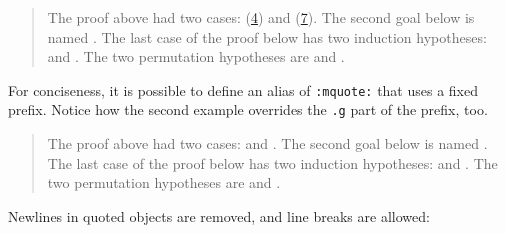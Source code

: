 \documentclass[a4paper]{article}
\begin{document}
\begin{quote}
The proof above had two cases:  (\hyperref[references-rst-s-destruct-n-g-1-h-n-0-0]{4}) and  (\hyperref[references-rst-s-destruct-n-g-s-n0-h-n-s-0]{7}).
The second goal below is named .
The last case of the proof below has two induction hypotheses:  and . The two permutation hypotheses are  and .
\end{quote}

For conciseness, it is possible to define an alias of \texttt{:mquote:} that uses a fixed prefix.  Notice how the second example overrides the \texttt{.g} part of the prefix, too.

\begin{quote}
The proof above had two cases:  and .
The second goal below is named .
The last case of the proof below has two induction hypotheses:  and .
The two permutation hypotheses are  and .
\end{quote}

Newlines in quoted objects are removed, and line breaks are allowed:
\end{document}
